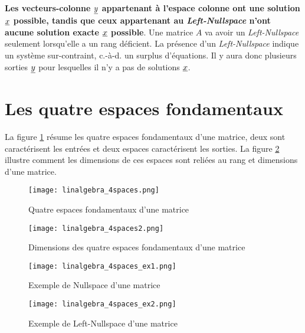 \textbf{Les vecteurs-colonne $\underline{y}$ appartenant à l'espace colonne ont une solution $\underline{x}$ possible, tandis que ceux appartenant au \textit{Left-Nullspace} n'ont aucune solution exacte $\underline{x}$ possible}.
%
Une matrice $A$ va avoir un \textit{Left-Nullspace} seulement lorsqu'elle a un rang déficient. La présence d'un \textit{Left-Nullspace} indique un système sur-contraint, c.-à-d. un surplus d'équations. Il y aura donc plusieurs sorties $\underline{y}$ pour lesquelles il n'y a pas de solutions $\underline{x}$.


\newpage
\section{Les quatre espaces fondamentaux}
\label{sec:4espfond}

La figure \ref{fig:4spaces} résume les quatre espaces fondamentaux d'une matrice, deux sont caractérisent les entrées et deux espaces caractérisent les sorties. La figure \ref{fig:4spaces2} illustre comment les dimensions de ces espaces sont reliées au rang et dimensions d'une matrice.

\begin{figure}[H]
	\centering
	\texttt{[image: linalgebra\_4spaces.png]}
	\caption{Quatre espaces fondamentaux d'une matrice}
	\label{fig:4spaces}
\end{figure}

\begin{figure}[H]
	\centering
	\texttt{[image: linalgebra\_4spaces2.png]}
	\caption{Dimensions des quatre espaces fondamentaux d'une matrice}
	\label{fig:4spaces2}
\end{figure}

\begin{figure}[H]
	\centering
	\texttt{[image: linalgebra\_4spaces\_ex1.png]}
	\caption{Exemple de Nullspace d'une matrice}
	\label{fig:4spaces_ex1}
\end{figure}

\begin{figure}[H]
	\centering
	\texttt{[image: linalgebra\_4spaces\_ex2.png]}
	\caption{Exemple de Left-Nullspace d'une matrice}
	\label{fig:4spaces_ex2}
\end{figure}


